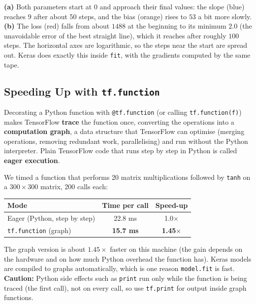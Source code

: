 \begin{explain}
\textbf{(a)} Both parameters start at $0$ and approach their final values: the slope (blue) reaches $9$ after about 50 steps, and the bias (orange) rises to $53$ a bit more slowly. \textbf{(b)} The loss (red) falls from about $1488$ at the beginning to its minimum $2.0$ (the unavoidable error of the best straight line), which it reaches after roughly $100$ steps. The horizontal axes are logarithmic, so the steps near the start are spread out. Keras does exactly this inside \texttt{fit}, with the gradients computed by the same tape.
\end{explain}

\subsection{Speeding Up with \texttt{tf.function}}

\begin{definition}
Decorating a Python function with \texttt{@tf.function} (or calling \texttt{tf.function(f)}) makes TensorFlow \textbf{trace} the function once, converting the operations into a \textbf{computation graph}, a data structure that TensorFlow can optimise (merging operations, removing redundant work, parallelising) and run without the Python interpreter. Plain TensorFlow code that runs step by step in Python is called \textbf{eager execution}.
\end{definition}

We timed a function that performs 20 matrix multiplications followed by \texttt{tanh} on a $300\times300$ matrix, 200 calls each:

\begin{center}
\begin{tabular}{@{}lcc@{}}
\toprule
\textbf{Mode} & \textbf{Time per call} & \textbf{Speed-up}\\
\midrule
Eager (Python, step by step) & 22.8 ms & 1.0$\times$\\
\texttt{tf.function} (graph) & \textbf{15.7 ms} & \textbf{1.45$\times$}\\
\bottomrule
\end{tabular}
\end{center}

\noindent The graph version is about $1.45\times$ faster on this machine (the gain depends on the hardware and on how much Python overhead the function has). Keras models are compiled to graphs automatically, which is one reason \texttt{model.fit} is fast. \textbf{Caution:} Python side effects such as \texttt{print} run only while the function is being traced (the first call), not on every call, so use \texttt{tf.print} for output inside graph functions.

